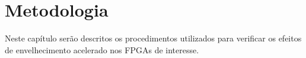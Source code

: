 \chapter{Metodologia}
Neste capítulo serão descritos os procedimentos utilizados para verificar os efeitos de envelhecimento acelerado nos FPGAs de interesse.



